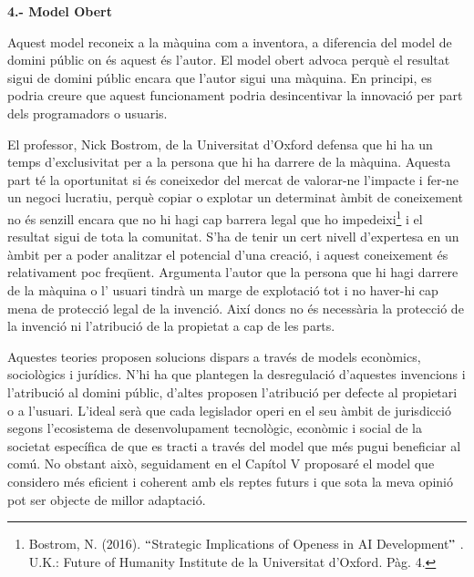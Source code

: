 \documentclass[12pt]{article}
\begin{document}
\vspace{\baselineskip}
\begin{justify}
\textbf{4.- Model Obert}
\end{justify}\par


\vspace{\baselineskip}
\begin{justify}
Aquest model reconeix a la màquina com a inventora, a diferencia del model de domini públic on és aquest és l’autor.  El model obert advoca perquè el resultat sigui de domini públic encara que l’autor sigui una màquina. En principi, es podria creure que aquest funcionament podria desincentivar la innovació per part dels programadors o usuaris. 
\end{justify}\par


\vspace{\baselineskip}
\begin{justify}
El professor, Nick Bostrom,  de la Universitat d’Oxford defensa que hi ha un temps d’exclusivitat per a la persona que hi ha darrere de la màquina. Aquesta part té la oportunitat si és coneixedor del mercat de valorar-ne l’impacte i fer-ne un negoci lucratiu, perquè copiar o explotar un determinat àmbit de coneixement no és senzill encara que no hi hagi cap barrera legal que ho impedeixi\footnote{ Bostrom, N. (2016). $``$Strategic Implications of Openess in AI Development$"$ . U.K.: Future of Humanity Institute de la Universitat d’Oxford. Pàg. 4.  } i el resultat sigui de tota la comunitat. S’ha de tenir un cert nivell d’expertesa en un àmbit per a poder analitzar el potencial d’una creació, i aquest coneixement és relativament poc freqüent. Argumenta l’autor que la persona que hi hagi darrere de la màquina o l’ usuari tindrà un marge de explotació tot i no haver-hi cap mena de protecció legal de la invenció. Així doncs no és necessària la protecció de la invenció ni l’atribució de la propietat a cap de les parts. 
\end{justify}\par


\vspace{\baselineskip}
\begin{justify}
Aquestes teories proposen solucions dispars a través de models econòmics, sociològics i jurídics. N’hi ha que plantegen la desregulació d’aquestes invencions i l’atribució al domini públic, d’altes proposen l’atribució per defecte al propietari o a l’usuari. L’ideal serà que cada legislador operi en el seu àmbit de jurisdicció segons l’ecosistema de desenvolupament tecnològic, econòmic i social de la societat específica de que es tracti a través del model que més pugui beneficiar al comú. No obstant això, seguidament en el Capítol V proposaré el model que considero més eficient i coherent amb els reptes futurs i que sota la meva opinió pot ser objecte de millor adaptació. 
\end{justify}\par
\end{document}
